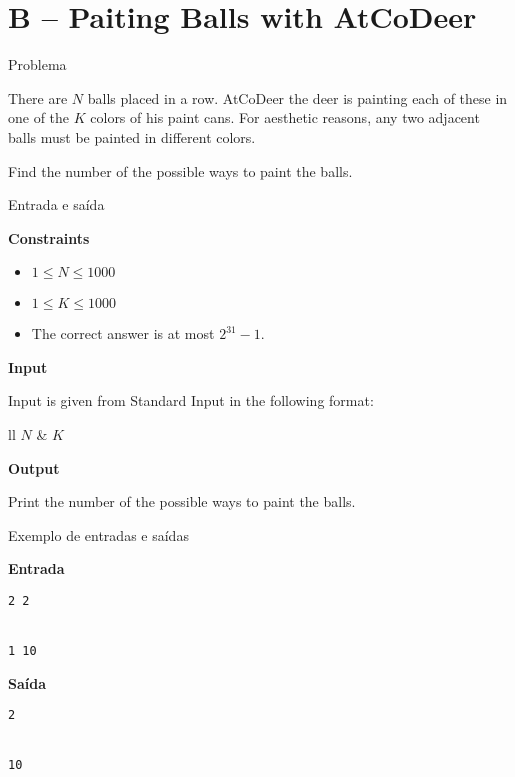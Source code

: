 \section{B -- Paiting Balls with AtCoDeer}

\begin{frame}[fragile]{Problema}

There are $N$ balls placed in a row. AtCoDeer the deer is painting each of these in one of the 
$K$ colors of his paint cans. For aesthetic reasons, any two adjacent balls must be painted in
different colors.

Find the number of the possible ways to paint the balls.

\end{frame}

\begin{frame}[fragile]{Entrada e saída}

\textbf{Constraints}

\begin{itemize}
    \item $1\leq N\leq 1000$
    \item $1\leq K\leq 1000$
    \item The correct answer is at most $2^{31} - 1$.
\end{itemize}

\textbf{Input}

Input is given from Standard Input in the following format:
\begin{atcoderio}{ll}
$N$ & $K$ \\
\end{atcoderio}

\textbf{Output}

Print the number of the possible ways to paint the balls.

\end{frame}

\begin{frame}[fragile]{Exemplo de entradas e saídas}

\begin{minipage}[t]{0.45\textwidth}
\textbf{Entrada}
\begin{verbatim}
2 2


1 10
\end{verbatim}
\end{minipage}
\begin{minipage}[t]{0.5\textwidth}
\textbf{Saída}
\begin{verbatim}
2


10
\end{verbatim}
\end{minipage}
\end{frame}

